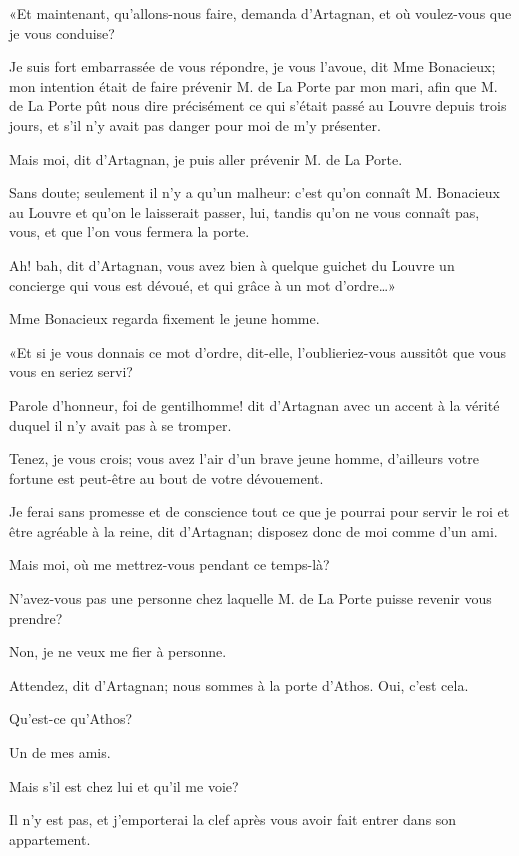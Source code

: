 «Et maintenant, qu'allons-nous faire, demanda d'Artagnan, et où voulez-vous que je vous conduise? 

\speak  Je suis fort embarrassée de vous répondre, je vous l'avoue, dit Mme Bonacieux; mon intention était de faire prévenir M. de La Porte par mon mari, afin que M. de La Porte pût nous dire précisément ce qui s'était passé au Louvre depuis trois jours, et s'il n'y avait pas danger pour moi de m'y présenter. 

\speak  Mais moi, dit d'Artagnan, je puis aller prévenir M. de La Porte. 

\speak  Sans doute; seulement il n'y a qu'un malheur: c'est qu'on connaît M. Bonacieux au Louvre et qu'on le laisserait passer, lui, tandis qu'on ne vous connaît pas, vous, et que l'on vous fermera la porte. 

\speak  Ah! bah, dit d'Artagnan, vous avez bien à quelque guichet du Louvre un concierge qui vous est dévoué, et qui grâce à un mot d'ordre\dots» 

Mme Bonacieux regarda fixement le jeune homme. 

«Et si je vous donnais ce mot d'ordre, dit-elle, l'oublieriez-vous aussitôt que vous vous en seriez servi? 

\speak  Parole d'honneur, foi de gentilhomme! dit d'Artagnan avec un accent à la vérité duquel il n'y avait pas à se tromper. 

\speak  Tenez, je vous crois; vous avez l'air d'un brave jeune homme, d'ailleurs votre fortune est peut-être au bout de votre dévouement. 

\speak  Je ferai sans promesse et de conscience tout ce que je pourrai pour servir le roi et être agréable à la reine, dit d'Artagnan; disposez donc de moi comme d'un ami. 

\speak  Mais moi, où me mettrez-vous pendant ce temps-là? 

\speak  N'avez-vous pas une personne chez laquelle M. de La Porte puisse revenir vous prendre? 

\speak  Non, je ne veux me fier à personne. 

\speak  Attendez, dit d'Artagnan; nous sommes à la porte d'Athos. Oui, c'est cela. 

\speak  Qu'est-ce qu'Athos? 

\speak  Un de mes amis. 

\speak  Mais s'il est chez lui et qu'il me voie? 

\speak  Il n'y est pas, et j'emporterai la clef après vous avoir fait entrer dans son appartement. 

